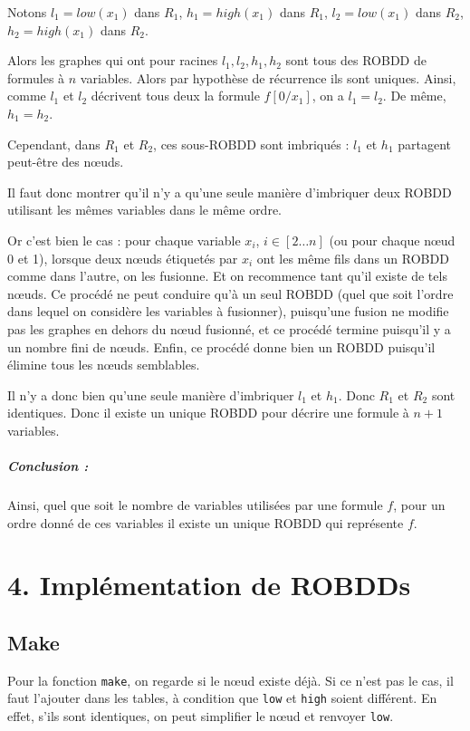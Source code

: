 \documentclass[12pt]{article}
\def\code#1{\texttt{#1}}
\begin{document}
Notons $l_1 = low(x_1)$ dans $R_1$,  $h_1 = high(x_1)$ dans $R_1$, $l_2 = low(x_1)$ dans $R_2$,  $h_2 = high(x_1)$ dans $R_2$.

Alors les graphes qui ont pour racines $l_1, l_2, h_1, h_2$ sont tous des ROBDD de formules à $n$ variables. Alors par hypothèse de récurrence ils sont uniques. Ainsi, comme $l_1$ et $l_2$ décrivent tous deux la formule $f[0/x_1]$, on a $l_1=l_2$. De même, $h_1=h_2$.

Cependant, dans $R_1$ et $R_2$, ces sous-ROBDD sont imbriqués : $l_1$ et $h_1$ partagent peut-être des n\oe uds.

Il faut donc montrer qu'il n'y a qu'une seule manière d'imbriquer deux ROBDD utilisant les mêmes variables dans le même ordre.

Or c'est bien le cas : pour chaque variable $x_i$, $i\in[2\dots n]$ (ou pour chaque n\oe ud 0 et 1), lorsque deux n\oe uds étiquetés par $x_i$ ont les même fils dans un ROBDD comme dans l'autre, on les fusionne. Et on recommence tant qu'il existe de tels n\oe uds. Ce procédé ne peut conduire qu'à un seul ROBDD (quel que soit l'ordre dans lequel on considère les variables à fusionner), puisqu'une fusion ne modifie pas les graphes en dehors du n\oe ud fusionné, et ce procédé termine puisqu'il y a un nombre fini de n\oe uds. Enfin, ce procédé donne bien un ROBDD puisqu'il élimine tous les n\oe uds semblables.

Il n'y a donc bien qu'une seule manière d'imbriquer $l_1$ et $h_1$. Donc $R_1$ et $R_2$ sont identiques. Donc il existe un unique ROBDD pour décrire une formule à $n+1$ variables.

\subparagraph{Conclusion :} Ainsi, quel que soit le nombre de variables utilisées par une formule $f$, pour un ordre donné de ces variables il existe un unique ROBDD qui représente $f$.


\section*{4. Implémentation de ROBDDs}
\subsection*{Make}
Pour la fonction \code{make}, on regarde si le n\oe ud existe déjà. Si ce n'est pas le cas, il faut l'ajouter dans les tables, à condition que \code{low} et \code{high} soient différent. En effet, s'ils sont identiques, on peut simplifier le n\oe ud et renvoyer \code{low}.
\end{document}
